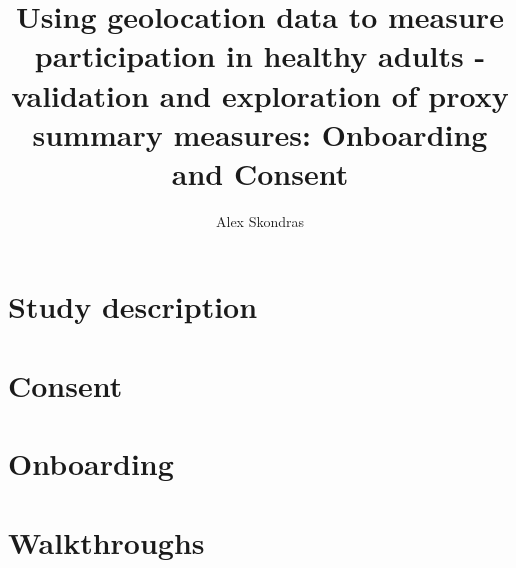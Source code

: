 \documentclass[12pt]{article}
\begin{document}
\title{Using geolocation data to measure participation in healthy adults - validation and exploration of proxy summary measures:
Onboarding and Consent}
\author{Alex Skondras}
\date{}
\maketitle

\tableofcontents
\vspace{0.75\baselineskip}

\section{Study description}


\section{Consent}



\section{Onboarding}


\section{Walkthroughs}

\end{document}
